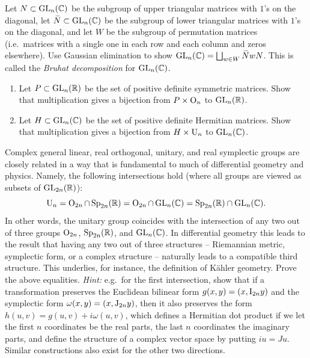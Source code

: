 \begin{xca}
    Let $N\subset \operatorname{GL}_n(\mathbb{C})$ be the subgroup of upper triangular matrices with $1$'s on the diagonal, let $\wb{N}\subset \GL_n(\bbC)$ be the subgroup of lower triangular matrices with $1$'s on the diagonal, and let $W$ be the subgroup of permutation matrices (i.e.~matrices with a single one in each row and each column and zeros elsewhere). Use Gaussian elimination to show $\GL_n(\bbC)=\bigsqcup_{w\in W}\wb{N}wN$. This is called the \emph{Bruhat decomposition} for $\operatorname{GL}_n(\mathbb{C})$.
\end{xca}

\begin{xca}
    \begin{enumerate}[label=(\alph*)]
        \item Let $P\subset \operatorname{GL}_n(\mathbb{R})$ be the set of positive definite symmetric matrices. Show that multiplication gives a bijection from $P\times \operatorname{O}_n$ to $\operatorname{GL}_n(\mathbb{R})$.
        \item Let $H\subset \operatorname{GL}_n(\mathbb{C})$ be the set of positive definite Hermitian matrices. Show that multiplication gives a bijection from $H\times\operatorname{U}_n$ to $\operatorname{GL}_n(\mathbb{C})$.
    \end{enumerate}
\end{xca}

\begin{xca}
    Complex general linear, real orthogonal, unitary, and real symplectic groups are closely related in a way that is fundamental to much of differential geometry and physics. Namely, the following intersections hold (where all groups are viewed as subsets of $\operatorname{GL}_{2n}(\mathbb{R})$):
    \[\operatorname{U}_n=\operatorname{O}_{2n}\cap \operatorname{Sp}_{2n}(\mathbb{R})=\operatorname{O}_{2n}\cap \operatorname{GL}_{n}(\mathbb{C})=\operatorname{Sp}_{2n}(\mathbb{R})\cap \operatorname{GL}_{n}(\mathbb{C}). \]
    In other words, the unitary group coincides with the intersection of any two out of three groups $\operatorname{O}_{2n}$, $\operatorname{Sp}_{2n}(\mathbb{R})$, and $\operatorname{GL}_{n}(\mathbb{C})$. In differential geometry this leads to the result that having any two out of three structures -- Riemannian metric, symplectic form, or a complex structure -- naturally leads to a compatible third structure. This underlies, for instance, the definition of K\"ahler geometry. Prove the above equalities. \emph{Hint:} e.g.~for the first intersection, show that if a transformation preserves the Euclidean bilinear form $g(x,y)=(x,\mathrm{I}_{2n}y)$ and the symplectic form $\omega(x,y)=(x,\mathrm{J}_{2n}y)$, then it also preserves the form $h(u,v)=g(u,v)+i\omega(u,v)$, which defines a Hermitian dot product if we let the first $n$ coordinates be the real parts, the last $n$ coordinates the imaginary parts, and define the structure of a complex vector space by putting $iu=Ju$. Similar constructions also exist for the other two directions.
\end{xca}







